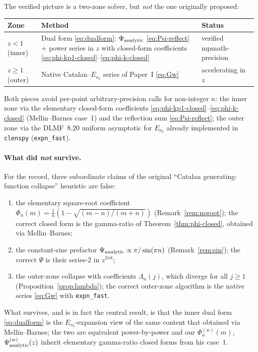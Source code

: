 \documentclass{article}
\begin{document}
The verified picture is a two-zone solver, but \emph{not} the one originally
proposed:
\begin{center}
\begin{tabular}{lp{8.5cm}l}
\toprule
Zone & Method & Status\\
\midrule
$z<1$ (inner) & Dual form \eqref{eq:dualform}: $\Psi_{\rm analytic}$
  \eqref{eq:Psi-reflect} $+$ power series in $z$ with closed-form
  coefficients \eqref{eq:phi-kp1-closed}--\eqref{eq:phi-k-closed} &
  verified mpmath-precision\\
$z\ge1$ (outer) & Native Catalan--$E_{\nu_k}$ series of Paper~I
  \eqref{eq:Gw} & accelerating in $z$\\
\bottomrule
\end{tabular}
\end{center}
Both pieces avoid per-point arbitrary-precision calls for non-integer $n$:
the inner zone via the elementary closed-form coefficients
\eqref{eq:phi-kp1-closed}--\eqref{eq:phi-k-closed} (Mellin--Barnes case~1) and
the reflection sum \eqref{eq:Psi-reflect}; the outer zone via the DLMF~8.20
uniform asymptotic for $E_{\nu_k}$ already implemented in \texttt{clenspy}
(\texttt{expn\_fast}).

\paragraph{What did \emph{not} survive.}
For the record, three subordinate claims of the original
``Catalan generating-function collapse'' heuristic are false:
\begin{enumerate}
\item the elementary square-root coefficient
$\Phi_n(m)=\tfrac1n(1-\sqrt{(m-n)/(m+n)})$ (Remark~\ref{rem:noroot}); the
correct closed form is the gamma-ratio of Theorem~\ref{thm:phi-closed},
obtained via Mellin--Barnes;
\item the constant-sine prefactor $\Psi_{\rm analytic}\propto\pi/\sin(\pi n)$
(Remark~\ref{rem:sin}); the correct $\Psi$ is their series-2 in $z^{2nk}$;
\item the outer-zone collapse with coefficients $\Lambda_n(j)$, which diverge
for all $j\ge1$ (Proposition~\ref{prop:lambda}); the correct outer-zone
algorithm is the native series \eqref{eq:Gw} with \texttt{expn\_fast}.
\end{enumerate}
What survives, and is in fact the central result, is that the inner dual form
\eqref{eq:dualform} is the $E_{\nu_k}$-expansion view of the same content
that \citet{RetanaMontenegro2012} obtained via Mellin--Barnes; the two are equivalent
power-by-power and our $\Phi^{(w)}_n(m)$, $\Psi^{(w)}_{\rm analytic}(z)$
inherit elementary gamma-ratio closed forms from his case~1.
\end{document}
